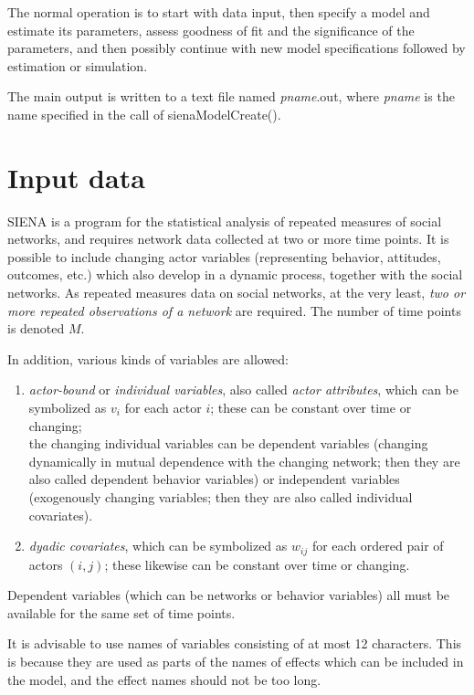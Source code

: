 \documentclass[a4paper,fleqn,11pt]{article}
\newcommand{\+}{\, + \,}
\newcommand{\SI}{{\sf SIENA }}
\begin{document}
{The normal operation is to start with data input, then specify a
model and estimate its parameters,
assess goodness of fit and the significance of the parameters,
and then possibly continue with new
model specifications followed by estimation or simulation.

The main output is written to a text file named
\textsf{\textsl{pname}.out}, where \textsf{\textsl{pname}} is the name
specified in the call of \textsf{sienaModelCreate()}.

\newpage

\section{Input data}
\label{S_InputData}

\SI  is a program for the statistical analysis
of repeated measures of social networks, and requires network data
collected at two or more time points. It is possible to include
changing actor variables (representing behavior, attitudes,
outcomes, etc.) which also develop in a dynamic process, together
with the social networks.
As repeated measures data on social networks, at the very least,
{\em two or more repeated observations of a network}
are required. The number of time points is denoted $M$.

In addition, various kinds of variables are allowed:

\begin{enumerate}
\item {\em actor-bound} or {\em individual variables},
      also called {\em actor attributes},
      which can be symbolized as $v_i$ for each actor $i$;
      these can be constant over time or changing; \\
      the changing individual variables can be dependent variables
      (changing dynamically in mutual dependence with the changing network;
      then they are also called dependent behavior variables)
      or independent variables (exogenously changing variables;
      then they are also called individual covariates).
\item {\em dyadic covariates}, which can be symbolized as $w_{ij}$
      for each ordered pair of actors $(i,j)$;
     these likewise can be constant over time or changing.
\end{enumerate}

Dependent variables (which can be networks or behavior variables)
all must be available for the same set of time points.

It is advisable to use names of variables consisting of at most 12 characters.
This is because they are used as parts of the names of effects which
can be included in the model, and the effect names should not be too long.

}
\end{document}
